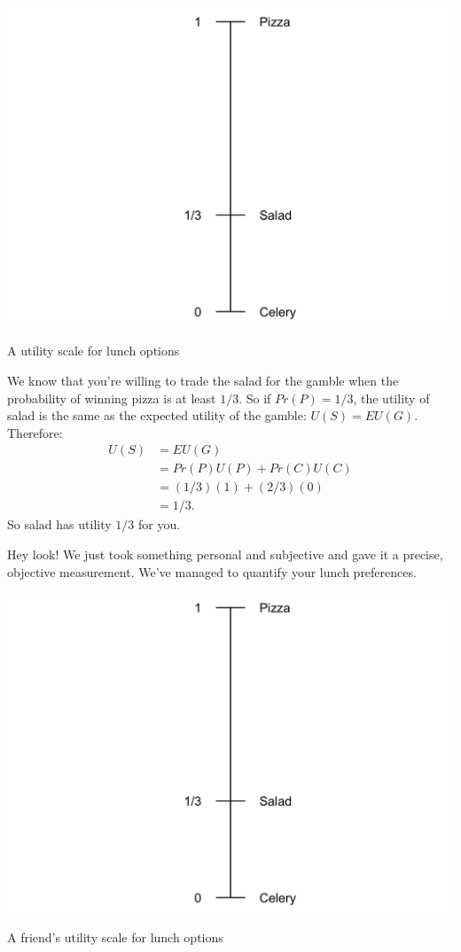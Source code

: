 \documentclass[justified]{tufte-book}
\renewcommand{\u}{U}
\newcommand{\p}{Pr}
\newcommand{\EU}{EU}
\theoremstyle{definition}
\theoremstyle{definition}
\theoremstyle{definition}
\theoremstyle{remark}
\begin{document}
\begin{marginfigure}
\includegraphics{_main_files/figure-latex/unnamed-chunk-104-1} \caption[A utility scale for lunch options]{A utility scale for lunch options}\label{fig:unnamed-chunk-104}
\end{marginfigure}

We know that you're willing to trade the salad for the gamble when the
probability of winning pizza is at least \(1/3\). So if \(\p(P) = 1/3\),
the utility of salad is the same as the expected utility of the gamble:
\(\u(S) = \EU(G)\). Therefore: \[
  \begin{aligned}
    \u(S) &= \EU(G)\\
      &= \p(P)\u(P) + \p(C)\u(C)\\
      &= (1/3)(1) + (2/3)(0)\\
      &= 1/3.
  \end{aligned}
\] So salad has utility \(1/3\) for you.

Hey look! We just took something personal and subjective and gave it a
precise, objective measurement. We've managed to quantify your lunch
preferences.

\begin{marginfigure}
\includegraphics{_main_files/figure-latex/unnamed-chunk-105-1} \caption[A friend's utility scale for lunch options]{A friend's utility scale for lunch options}\label{fig:unnamed-chunk-105}
\end{marginfigure}
\end{document}
